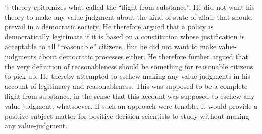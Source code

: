 \documentclass[preprint, french, english, 11pt]{elsarticle}%
\begin{document}
\cite{rawls_political_2005}'s theory epitomizes what \cite{estlund_democratic_2009} called the ``flight from substance''. He did not want his theory to make any value-judgment about the kind of state of affair that should prevail in a democratic society. He therefore argued that a policy is democratically legitimate if it is based on a constitution whose justification is acceptable to all ``reasonable'' citizens. But he did not want to make value-judgments about democratic processes either. He therefore further argued that the very definition of reasonableness should be something for reasonable citizens to pick-up. He thereby attempted to eschew making any value-judgments in his account of legitimacy and reasonableness. This was supposed to be a complete flight from substance, in the sense that this account was supposed to eschew any value-judgment, whatsoever. If such an approach were tenable, it would provide a positive subject matter for positive decision scientists to study without making any value-judgment.
\end{document}
